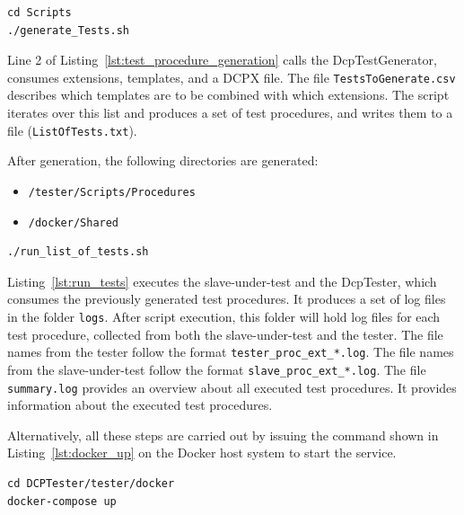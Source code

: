 \documentclass[a4paper]{scrartcl}
\theoremstyle{definition}
\begin{document}
\lstset{language=bash, numbers=left, numberstyle=\tiny, numbersep=10pt, frame=lines, captionpos=t, aboveskip=10pt, belowskip=10pt}
\begin{lstlisting}[caption=Test procedure generation, label=lst:test_procedure_generation]
cd Scripts
./generate_Tests.sh
\end{lstlisting}

Line 2 of Listing~\ref{lst:test_procedure_generation} calls the DcpTestGenerator, consumes extensions, templates, and a DCPX file.
The file \texttt{TestsToGenerate.csv} describes which templates are to be combined with which extensions.
The script iterates over this list and produces a set of test procedures, and writes them to a file (\texttt{ListOfTests.txt}).

After generation, the following directories are generated:
\begin{itemize}
		\item \texttt{/tester/Scripts/Procedures}
		\item \texttt{/docker/Shared}
\end{itemize}

\lstset{language=bash, numbers=left, numberstyle=\tiny, numbersep=10pt, frame=lines, captionpos=t, aboveskip=10pt, belowskip=10pt}
\begin{lstlisting}[caption=Test procedure generation, label=lst:run_tests]
./run_list_of_tests.sh
\end{lstlisting}

Listing~\ref{lst:run_tests} executes the slave-under-test and the DcpTester, which consumes the previously generated test procedures.
It produces a set of log files in the folder \texttt{logs}.
After script execution, this folder will hold log files for each test procedure, collected from both the slave-under-test and the tester.
The file names from the tester follow the format \texttt{tester\_proc\_ext\_*.log}.
The file names from the slave-under-test follow the format \texttt{slave\_proc\_ext\_*.log}.
The file \texttt{summary.log} provides an overview about all executed test procedures.
It provides information about the executed test procedures.

Alternatively, all these steps are carried out by issuing the command shown in Listing~\ref{lst:docker_up} on the Docker host system to start the service.

\lstset{language=bash, numbers=left, numberstyle=\tiny, numbersep=10pt, frame=lines, captionpos=t, aboveskip=10pt, belowskip=10pt}
\begin{lstlisting}[caption=Start Docker container and execute the defined service., label=lst:docker_up]
cd DCPTester/tester/docker
docker-compose up
\end{lstlisting}
\end{document}
